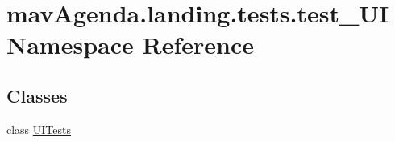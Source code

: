 \hypertarget{namespacemavAgenda_1_1landing_1_1tests_1_1test__UI}{}\section{mav\+Agenda.\+landing.\+tests.\+test\+\_\+\+UI Namespace Reference}
\label{namespacemavAgenda_1_1landing_1_1tests_1_1test__UI}
\subsection*{Classes}
\begin{DoxyCompactItemize}
\item 
class \mbox{\hyperlink{classmavAgenda_1_1landing_1_1tests_1_1test__UI_1_1UITests}{U\+I\+Tests}}
\end{DoxyCompactItemize}
